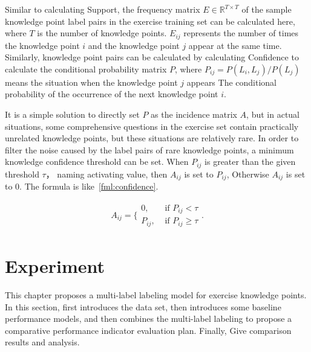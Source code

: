 Similar to calculating Support, the frequency matrix \(E\in \mathbb{R}^{T\times T}\) of the sample knowledge point label pairs in the exercise training set can be calculated here, where \(T\) is the number of knowledge points. \(E_{ij}\) represents the number of times the knowledge point \(i\) and the knowledge point \(j\) appear at the same time. Similarly, knowledge point pairs can be calculated by calculating Confidence to calculate the conditional probability matrix \(P\), where \(P_{ij}=P(L_i, L_j)/P(L_j)\) means the situation when the knowledge point \(j\) appears The conditional probability of the occurrence of the next knowledge point \(i\).

It is a simple solution to directly set \(P\) as the incidence matrix \(A\), but in actual situations, some comprehensive questions in the exercise set contain practically unrelated knowledge points, but these situations are relatively rare. In order to filter the noise caused by the label pairs of rare knowledge points, a minimum knowledge confidence threshold can be set. When \(P_{ij}\) is greater than the given threshold \(\tau \)， naming activating value, then \(A_{ij}\) is set to \(P_{ij}\), Otherwise \(A_{ij}\) is set to 0. The formula is like~\ref{fml:confidence}.

\begin{align}
	A_{i j}=\{\begin{array}{ll}
		0,      & \text { if } P_{i j}<\tau      \\
		P_{ij}, & \text { if } P_{i j} \geq \tau
	\end{array}.\label{fml:confidence}
\end{align}

\section{Experiment}
This chapter proposes a multi-label labeling model for exercise knowledge points. In this section, first introduces the data set, then introduces some baseline performance models, and then combines the multi-label labeling to propose a comparative performance indicator evaluation plan. Finally, Give comparison results and analysis.
